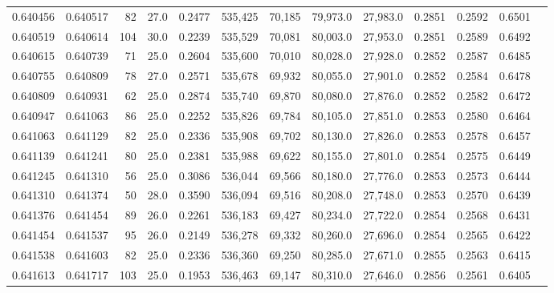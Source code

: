 \begin{tabular}{rrrrrrrrrrrrr}
0.640456 & 0.640517 &    82 & 27.0 &                                     0.2477 & 535,425 &  70,185 &  79,973.0 &  27,983.0 & 0.2851 & 0.2592 & 0.6501 \\
0.640519 & 0.640614 &   104 & 30.0 &                                     0.2239 & 535,529 &  70,081 &  80,003.0 &  27,953.0 & 0.2851 & 0.2589 & 0.6492 \\
0.640615 & 0.640739 &    71 & 25.0 &                                     0.2604 & 535,600 &  70,010 &  80,028.0 &  27,928.0 & 0.2852 & 0.2587 & 0.6485 \\
0.640755 & 0.640809 &    78 & 27.0 &                                     0.2571 & 535,678 &  69,932 &  80,055.0 &  27,901.0 & 0.2852 & 0.2584 & 0.6478 \\
0.640809 & 0.640931 &    62 & 25.0 &                                     0.2874 & 535,740 &  69,870 &  80,080.0 &  27,876.0 & 0.2852 & 0.2582 & 0.6472 \\
0.640947 & 0.641063 &    86 & 25.0 &                                     0.2252 & 535,826 &  69,784 &  80,105.0 &  27,851.0 & 0.2853 & 0.2580 & 0.6464 \\
0.641063 & 0.641129 &    82 & 25.0 &                                     0.2336 & 535,908 &  69,702 &  80,130.0 &  27,826.0 & 0.2853 & 0.2578 & 0.6457 \\
0.641139 & 0.641241 &    80 & 25.0 &                                     0.2381 & 535,988 &  69,622 &  80,155.0 &  27,801.0 & 0.2854 & 0.2575 & 0.6449 \\
0.641245 & 0.641310 &    56 & 25.0 &                                     0.3086 & 536,044 &  69,566 &  80,180.0 &  27,776.0 & 0.2853 & 0.2573 & 0.6444 \\
0.641310 & 0.641374 &    50 & 28.0 &                                     0.3590 & 536,094 &  69,516 &  80,208.0 &  27,748.0 & 0.2853 & 0.2570 & 0.6439 \\
0.641376 & 0.641454 &    89 & 26.0 &                                     0.2261 & 536,183 &  69,427 &  80,234.0 &  27,722.0 & 0.2854 & 0.2568 & 0.6431 \\
0.641454 & 0.641537 &    95 & 26.0 &                                     0.2149 & 536,278 &  69,332 &  80,260.0 &  27,696.0 & 0.2854 & 0.2565 & 0.6422 \\
0.641538 & 0.641603 &    82 & 25.0 &                                     0.2336 & 536,360 &  69,250 &  80,285.0 &  27,671.0 & 0.2855 & 0.2563 & 0.6415 \\
0.641613 & 0.641717 &   103 & 25.0 &                                     0.1953 & 536,463 &  69,147 &  80,310.0 &  27,646.0 & 0.2856 & 0.2561 & 0.6405 \\

\end{tabular}
